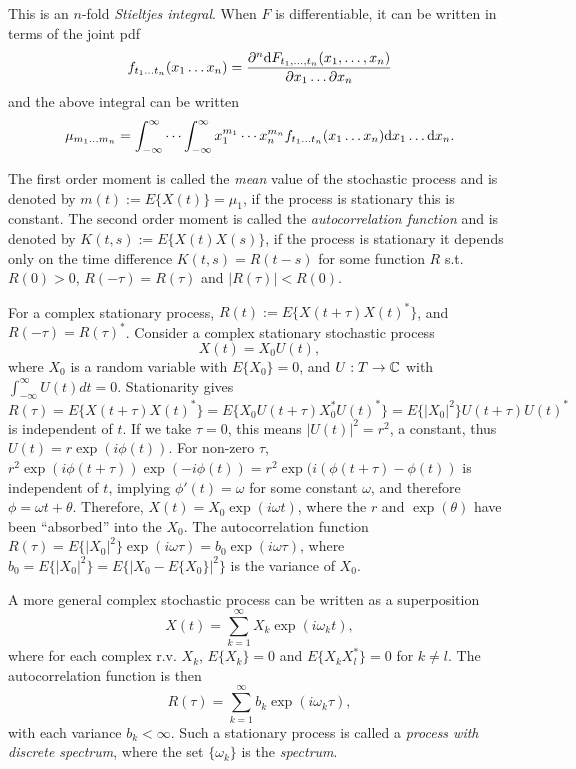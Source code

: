 This is an $n$-fold \textit{Stieltjes integral}. When $F$ is differentiable, it can be written in terms of the joint pdf 
\begin{equation}
f_{t_1\ldots t_n}(x_1\ldots x_n) = \frac{{\partial}^n {\mbox{d}} F_{t_1, \ldots, t_n}(x_1,\ldots,x_n)}{{\partial} x_1 \ldots {\partial} x_n} 
\end{equation}
and the above integral can be written 
\begin{equation}
\mu_{m_1 \ldots m_n} = \int_{-\infty}^{\infty}\cdots \int_{-\infty}^{\infty}x_1^{m_1}\cdots x_n^{m_n} f_{t_1\ldots t_n}(x_1\ldots x_n) {\mbox{d}} x_1 \ldots {\mbox{d}} x_n.
\end{equation}


 The first order moment is called the \textit{mean} value of the stochastic process and is denoted by $m(t) := E\{X(t)\} =\mu_1$, if the process is stationary this is constant. The second order moment is called the \textit{autocorrelation function} and is denoted by $K(t,s) := E\{X(t)X(s)\}$, if the process is stationary it depends only on the time difference $K(t,s)=R(t-s)$ for some function $R$ s.t. $R(0)>0$, $R(-\tau)=R(\tau)$ and $|R(\tau)|<R(0)$.

For a complex stationary process, $R(t):=E\{X(t+\tau)X(t)^*\}$, and $R(-\tau)=R(\tau)^*$. Consider a complex stationary stochastic process 
\begin{equation}
X(t)=X_0 U(t),
\end{equation}
where $X_0$ is a random variable with $E\{X_0\}=0$, and $U:T\rightarrow \mathbb{C}$ with $\int_{-\infty}^{\infty} U(t)dt =0$. Stationarity gives $R(\tau)=E\{X(t+\tau)X(t)^*\}=E\{X_0 U(t+\tau) X_0^*U(t)^*\}=E\{|X_0|^2\}U(t+\tau)U(t)^*$ is independent of $t$. If we take $\tau=0$, this means $|U(t)|^2=r^2$, a constant, thus $U(t)=r\exp (i\phi(t))$. For non-zero $\tau$, $r^2 \exp (i\phi(t+\tau))\exp (-i\phi(t))=r^2 \exp (i(\phi(t+\tau)-\phi(t))$ is independent of $t$, implying $\phi'(t)=\omega$ for some constant $\omega$, and therefore $\phi=\omega t + \theta$. Therefore, $X(t)=X_0 \exp(i\omega t)$, where the $r$ and $\exp(\theta)$ have been ``absorbed'' into the $X_0$. The autocorrelation function $R(\tau)=E\{|X_0|^2\}\exp(i\omega \tau )=b_0 \exp(i\omega \tau )$, where $b_0=E\{|X_0|^2\}=E\{|X_0-E\{X_0\}|^2\}$ is the variance of $X_0$.

A more general complex stochastic process can be written as a superposition 
\begin{equation}
X(t)=\sum_{k=1}^{\infty}X_k \exp(i\omega_k t),
\end{equation}
where for each complex r.v. $X_k$, $E\{X_k\}=0$ and $E\{X_k X_l^* \}=0$ for $k\neq l$. The autocorrelation function is then 
\begin{equation}
R(\tau)=\sum_{k=1}^{\infty} b_k \exp(i\omega_k \tau),
\end{equation}
with each variance $b_k < \infty$. Such a stationary process is called a \textit{process with discrete spectrum}, where the set $\{\omega_k\}$ is the \textit{spectrum}.

